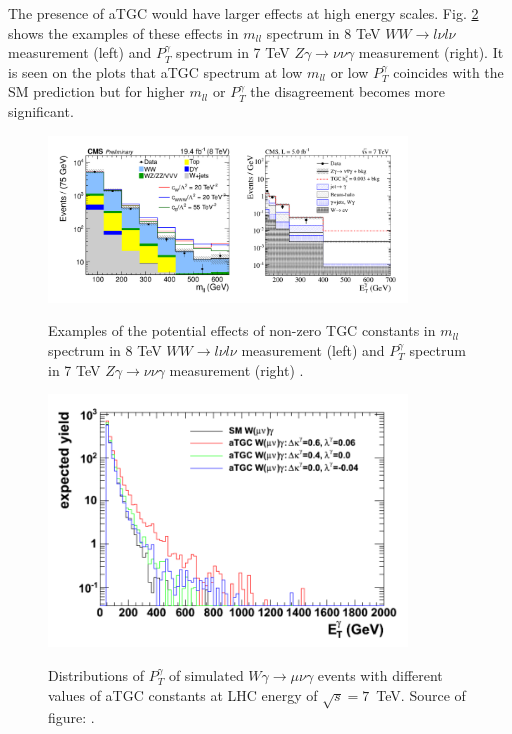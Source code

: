 The presence of aTGC would have larger effects at high energy scales. Fig. \ref{fig:aTGC_Pt_Examples} shows the examples of these effects in $m_{ll}$ spectrum in 8 TeV $WW \rightarrow l\nu l\nu$ measurement (left) and $P_T^{\gamma}$ spectrum in 7 TeV $Z\gamma \rightarrow \nu\nu\gamma$ measurement (right). It is seen on the plots that aTGC spectrum at low $m_{ll}$ or low $P_T^{\gamma}$ coincides with the SM prediction but for higher $m_{ll}$ or $P_T^{\gamma}$ the disagreement becomes more significant.\\

\begin{figure}[htb]
  \begin{center}
    {\includegraphics[width=0.85\textwidth]{../figs/WgAbout/aTGC_Pt_Examples.png}}
    \caption{Examples of the potential effects of non-zero TGC constants in $m_{ll}$ spectrum in 8 TeV $WW \rightarrow l\nu l\nu$ measurement (left) \cite{ref_CMS_8TeV_WW} and $P_T^{\gamma}$ spectrum in 7 TeV $Z\gamma \rightarrow \nu\nu\gamma$ measurement (right) \cite{ref_CMS_7TeV_Zgnunug}.}
    \label{fig:aTGC_Pt_Examples}
  \end{center}
\end{figure}

\begin{figure}[htb]
  \begin{center}
    {\includegraphics[width=0.85\textwidth]{../figs/WgAbout/aTGC_Pt_Wg.png}}
    \caption{Distributions of $P_T^\gamma$ of simulated $W\gamma\rightarrow\mu\nu\gamma$ events with different values of aTGC constants at LHC energy of $\sqrt{s}=7$~TeV. Source of figure:  \cite{ref_Senka_thesis}.}
    \label{fig:aTGC_Pt_Examples}
  \end{center}
\end{figure}

